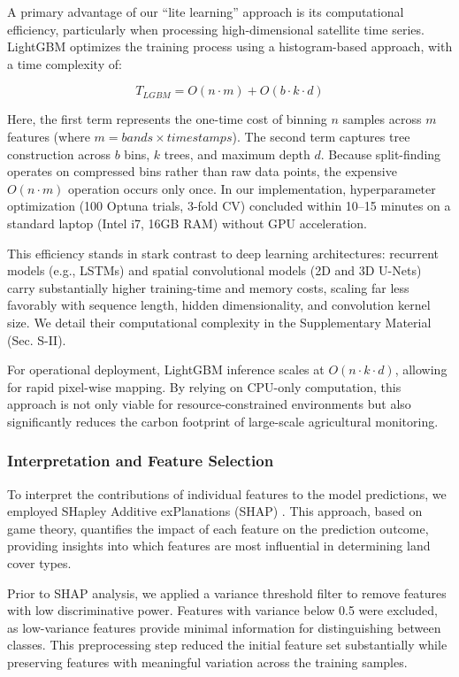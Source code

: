 \documentclass[
  journal,
  twocolumn]{IEEEtran}
\begin{document}
A primary advantage of our ``lite learning'' approach is its
computational efficiency, particularly when processing high-dimensional
satellite time series. LightGBM optimizes the training process using a
histogram-based approach, with a time complexity of:

\[T_{LGBM} = O(n \cdot m) + O(b \cdot k \cdot d)\]

Here, the first term represents the one-time cost of binning \(n\)
samples across \(m\) features (where \(m = bands \times timestamps\)).
The second term captures tree construction across \(b\) bins, \(k\)
trees, and maximum depth \(d\). Because split-finding operates on
compressed bins rather than raw data points, the expensive
\(O(n \cdot m)\) operation occurs only once. In our implementation,
hyperparameter optimization (100 Optuna trials, 3-fold CV) concluded
within 10--15 minutes on a standard laptop (Intel i7, 16GB RAM) without
GPU acceleration.

This efficiency stands in stark contrast to deep learning architectures:
recurrent models (e.g., LSTMs) and spatial convolutional models (2D and
3D U-Nets) carry substantially higher training-time and memory costs,
scaling far less favorably with sequence length, hidden dimensionality,
and convolution kernel size. We detail their computational complexity in
the Supplementary Material (Sec. S-II).

For operational deployment, LightGBM inference scales at
\(O(n \cdot k \cdot d)\), allowing for rapid pixel-wise mapping. By
relying on CPU-only computation, this approach is not only viable for
resource-constrained environments but also significantly reduces the
carbon footprint of large-scale agricultural monitoring.

\subsubsection{Interpretation and Feature
Selection}\label{interpretation-and-feature-selection}

To interpret the contributions of individual features to the model
predictions, we employed SHapley Additive exPlanations (SHAP)
\citep{shaps_2017}. This approach, based on game theory, quantifies the
impact of each feature on the prediction outcome, providing insights
into which features are most influential in determining land cover
types.

Prior to SHAP analysis, we applied a variance threshold filter to remove
features with low discriminative power. Features with variance below 0.5
were excluded, as low-variance features provide minimal information for
distinguishing between classes. This preprocessing step reduced the
initial feature set substantially while preserving features with
meaningful variation across the training samples.
\end{document}
